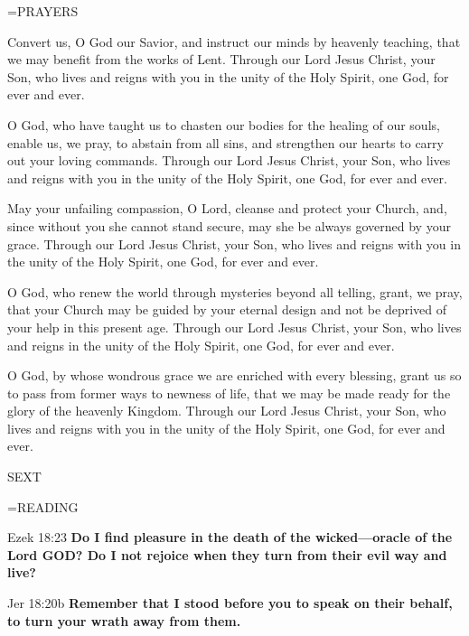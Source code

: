 \hangindent=\parindent \small PRAYERS
\begin{description}[labelindent=\parindent, leftmargin=*]
\item [Week 1:] 	Convert us, O God our Savior, and instruct our minds by heavenly teaching, that we may benefit from the works of Lent. Through our Lord Jesus Christ, your Son, who lives and reigns with you in the unity of the Holy Spirit, one God, for ever and ever.
\item [Week 2:] 	O God, who have taught us to chasten our bodies for the healing of our souls, enable us, we pray, to abstain from all sins, and strengthen our hearts to carry out your loving commands. Through our Lord Jesus Christ, your Son, who lives and reigns with you in the unity of the Holy Spirit, one God, for ever and ever.
\item [Week 3:] 	May your unfailing compassion, O Lord, cleanse and protect your Church, and, since without you she cannot stand secure, may she be always governed by your grace. Through our Lord Jesus Christ, your Son, who lives and reigns with you in the unity of the Holy Spirit, one God, for ever and ever.
\item [Week 4:] 	O God, who renew the world through mysteries beyond all telling, grant, we pray, that your Church may be guided by your eternal design and not be deprived of your help in this present age. Through our Lord Jesus Christ, your Son, who lives and reigns in the unity of the Holy Spirit, one God, for ever and ever.
\item [Week 5:] 	O God, by whose wondrous grace we are enriched with every blessing, grant us so to pass from former ways to newness of life, that we may be made ready for the glory of the heavenly Kingdom. Through our Lord Jesus Christ, your Son, who lives and reigns with you in the unity of the Holy Spirit, one God, for ever and ever.
\end{description}

\begin{flushleft}\normalsize SEXT\\\end{flushleft}

\hangindent=\parindent \small READING
\begin{description}[labelindent=\parindent, leftmargin=*]
\item [Weeks 1-4:]     Ezek 18:23 \textbf{    Do I find pleasure in the death of the wicked—oracle of the Lord GOD? Do I not rejoice when they turn from their evil way and live? \\}
\item [Week 5:]     Jer 18:20b \textbf{    Remember that I stood before you to speak on their behalf, to turn your wrath away from them.\\}
\end{description}

